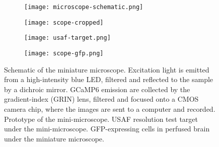 \begin{figure}[h]
    \begin{subfigure}[t]{.55\textwidth}
        \centering
        \texttt{[image: microscope-schematic.png]}
        \caption{\label{f.scope-schema}}
    \end{subfigure}
    \begin{subfigure}[t]{.45\textwidth}
        \centering
        \texttt{[image: scope-cropped]}
        \caption{\label{f.scope}}
    \end{subfigure}
    \begin{subfigure}[t]{.5\textwidth}
        \centering
        \texttt{[image: usaf-target.png]}
        \caption{\label{f.usaf}}
    \end{subfigure}
    \begin{subfigure}[t]{.5\textwidth}
        \centering
        \texttt{[image: scope-gfp.png]}
        \caption{\label{f.scope-gfp}}
    \end{subfigure}
    \caption[Schematic of the miniature microscope.]{ Schematic of the miniature microscope. Excitation light is emitted from a high-intensity blue LED, filtered and reflected to the sample by a dichroic mirror. GCaMP6 emission are collected by the gradient-index (GRIN) lens, filtered and focused onto a CMOS camera chip, where the images are sent to a computer and recorded. 
              Prototype of the mini-microscope.
              USAF resolution test target under the mini-microscope.
              GFP-expressing cells in perfused brain under the miniature microscope.}
\end{figure}

